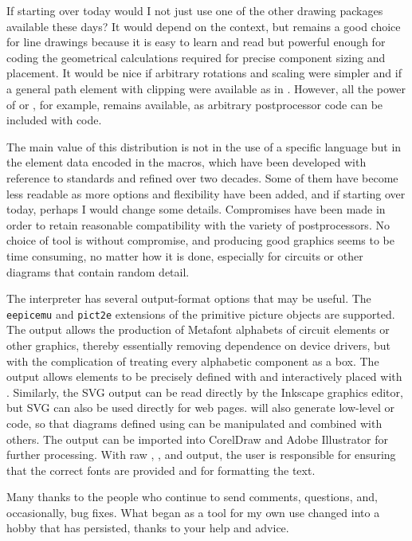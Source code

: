 If starting over today would I not just use one of the other drawing
packages available these days?  It would depend on the context, but
\pic remains a good choice for line drawings because it is easy to learn
and read but powerful enough for coding the geometrical calculations
required for precise component sizing and placement. It would be nice
if arbitrary rotations and scaling were simpler and if a general path
element with clipping were available as in \Postscript.  However, all the
power of \Postscript or \TPGF, for example, remains available,
as arbitrary postprocessor code can be included with \pic code.

The main value of this distribution is not in the use of a specific
language but in the element data encoded in the macros, which have been
developed with reference to standards and refined over two decades.
Some of them have become less readable as more options and flexibility
have been added, and if starting over today, perhaps I would change
some details. Compromises have been made in order to retain reasonable
compatibility with the variety of postprocessors.  No choice of tool
is without compromise, and producing good graphics seems to be time
consuming, no matter how it is done, especially for circuits
or other diagrams that contain random detail.

The \dpic interpreter has several output-format options that may be
useful.  The {\tt eepicemu} and {\tt pict2e} extensions of the
primitive \latex picture objects are supported.  The \mfpic output
allows the production of Metafont alphabets of circuit elements or
other graphics, thereby essentially removing dependence on device
drivers, but with the complication of treating every alphabetic
component as a \tex box.  The \xfig output allows elements to be
precisely defined with \dpic  and interactively placed with \xfig.
Similarly, the SVG output can be read directly by the Inkscape graphics
editor, but SVG can also be used directly for web pages.
\Dpic will also generate low-level \MetaPost or \Postscript code, so
that diagrams defined using \pic can be manipulated and combined with
others.  The \Postscript output can be imported into
CorelDraw
and Adobe Illustrator
for further processing.
With raw \Postscript, \PDF, and \SVG output, the user is
responsible for ensuring that the correct fonts are provided and for
formatting the text.

\pagebreak
Many thanks to the people who continue to send comments, questions,
and, occasionally, bug fixes. What began as a tool for my own use changed
into a hobby that has persisted, thanks to your help and advice.

